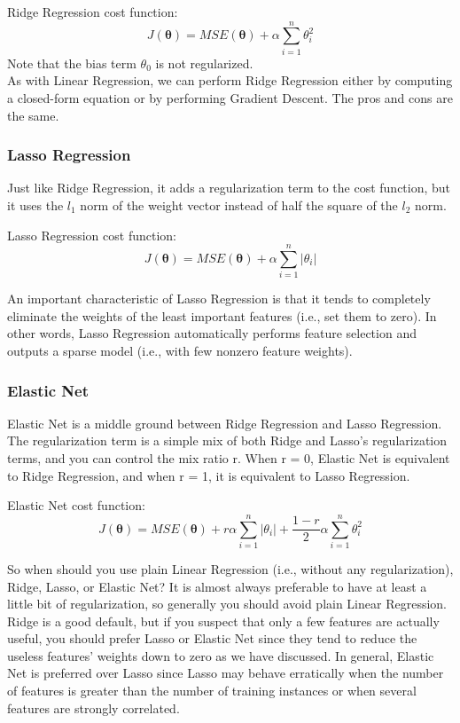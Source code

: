 \documentclass[french]{article}
\begin{document}
Ridge Regression cost function:
\[J(\bm{\theta}) = MSE(\bm{\theta}) + \alpha \sum_{i=1}^n \theta_i^2\]
Note that the bias term $\theta_0$ is not regularized.\\

As with Linear Regression, we can perform Ridge Regression either by computing a closed-form equation or by performing Gradient Descent. The pros and cons are the same.

\subsubsection{Lasso Regression}

Just like Ridge Regression, it adds a regularization term to the cost function, but it uses the $l_1$ norm of the weight vector instead of half the square of the $l_2$ norm.

Lasso Regression cost function:
\[J(\bm{\theta}) = MSE(\bm{\theta}) + \alpha \sum_{i=1}^n |\theta_i|\]

An important characteristic of Lasso Regression is that it tends to completely eliminate the weights of the least important features (i.e., set them to zero). In other words, Lasso Regression automatically performs feature selection and outputs a sparse model (i.e., with few nonzero feature weights).

\subsubsection{Elastic Net}

Elastic Net is a middle ground between Ridge Regression and Lasso Regression. The regularization term is a simple mix of both Ridge and Lasso’s regularization terms, and you can control the mix ratio r. When r = 0, Elastic Net is equivalent to Ridge Regression, and when r = 1, it is equivalent to Lasso Regression.

Elastic Net cost function:
\[J(\bm{\theta}) = MSE(\bm{\theta}) + r \alpha \sum_{i=1}^n |\theta_i| + \frac{1-r}{2} \alpha \sum_{i=1}^n \theta_i^2\]

So when should you use plain Linear Regression (i.e., without any regularization), Ridge, Lasso, or Elastic Net? It is almost always preferable to have at least a little bit of regularization, so generally you should avoid plain Linear Regression. Ridge is a good default, but if you suspect that only a few features are actually useful, you should prefer Lasso or Elastic Net since they tend to reduce the useless features’ weights down to zero as we have discussed. In general, Elastic Net is preferred over Lasso since Lasso may behave erratically when the number of features is greater than the number of training instances or when several features are strongly correlated.
\end{document}

